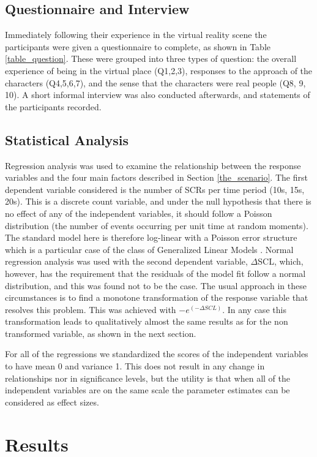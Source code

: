 \documentclass[
		twoside,openright,titlepage,numbers=noenddot,manychapters,
		headinclude,%
                footinclude=false,cleardoublepage=empty,
                BCOR=5mm,
		fontsize=11pt, %
                 enabledeprecatedfontcommands]{scrreprt}
\begin{document}
\subsection{ Questionnaire and Interview}
Immediately following their experience in the virtual reality scene the participants were given a questionnaire to complete, as shown in Table \ref{table_question}. These were grouped into three types of question: the overall experience of being in the virtual place (Q1,2,3), responses to the approach of the characters (Q4,5,6,7), and the sense that the characters were real people (Q8, 9, 10). A short informal interview was also conducted afterwards, and statements of the participants recorded.

\subsection{Statistical Analysis}
Regression analysis was used to examine the relationship between the response variables and the four main factors described in Section \ref{the_scenario}. The first dependent variable considered is the number of SCRs per time period (10s, 15s, 20s). This is a discrete count variable, and under the null hypothesis that there is no effect of any of the independent variables, it should follow a Poisson distribution (the number of events occurring per unit time at random moments). The standard model here is therefore log-linear with a Poisson error structure which is a particular case of the class of Generalized Linear Models \cite[]{mccullagh1989glm}. Normal regression analysis was used with the second dependent variable,  $\Delta$SCL, which, however, has the requirement that the residuals of the model fit follow a normal distribution, and this was found not to be the case. The usual approach in these circumstances is to find a monotone transformation of the response variable that resolves this problem. This was achieved with $-e^{(-\Delta SCL)}$. In any case this transformation leads to qualitatively almost the same results as for the non transformed variable, as shown in the next section.

For all of the regressions we standardized the scores of the independent variables to have mean 0 and variance 1. This does not result in any change in relationships nor in significance levels, but the utility is that when all of the independent variables are on the same scale the parameter estimates can be considered as effect sizes.


\section{Results}
\end{document}
